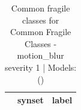 \begin{table}
\caption{Common fragile classes for Common Fragile Classes - motion_blur severity 1 | Models: ()}
\label{tab:Common Fragile Classes - motion_blur severity 1_d41d8cd9}
\begin{tabular}{cll}
\toprule
 & synset & label \\
\midrule
\bottomrule
\end{tabular}
\end{table}
